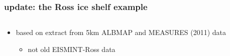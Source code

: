\documentclass[hide notes,intlimits]{beamer}
\begin{document}
\begin{frame}
  \frametitle{update: the Ross ice shelf example}

\begin{columns}
\begin{column}{0.7\textwidth}
\vspace{-5mm}
  \begin{itemize}
  \item based on extract from 5km ALBMAP and MEASURES (2011) data
    \begin{itemize}
    \item not old EISMINT-Ross data
    \end{itemize}
  \end{itemize}

\vspace{2mm}

\end{column}


\end{columns}
\end{frame}
\end{document}
